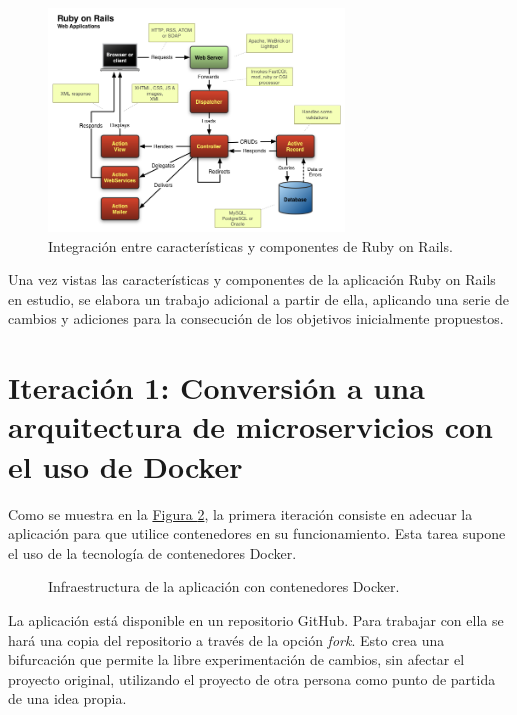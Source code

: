 \begin{figure}[H]
\centering
\includegraphics[width=0.7\textwidth]{images/figures/rubyonrails.png}
\caption{Integración entre características y componentes de Ruby on Rails.\footnotemark \label{fig:architecturesampleapp}}
\end{figure}


Una vez vistas las características y componentes de la aplicación Ruby on Rails en estudio, se elabora un trabajo adicional a partir de ella, aplicando una serie de cambios y adiciones para la consecución de los objetivos inicialmente propuestos.

\section[Iteración 1: Arquitectura de microservicios]{Iteración 1: Conversión a una arquitectura de microservicios con el uso de Docker}

Como se muestra en la \hyperref[fig:figure_docker_microservices]{Figura \ref{fig:figure_docker_microservices}}, la primera iteración consiste en adecuar la aplicación para que utilice contenedores en su funcionamiento. Esta tarea supone el uso de la tecnología de contenedores Docker.

\begin{figure}[H]
\caption{Infraestructura de la aplicación con contenedores Docker.\label{fig:figure_docker_microservices}}
\end{figure}

La aplicación  está disponible en un repositorio GitHub. Para trabajar con ella se hará una copia del repositorio a través de la opción \textit{fork}. Esto crea una bifurcación que permite la libre experimentación de cambios, sin afectar el proyecto original, utilizando el proyecto de otra persona como punto de partida de una idea propia.

